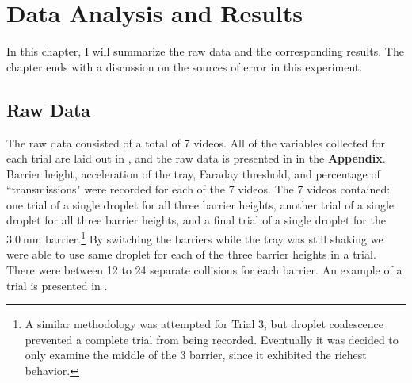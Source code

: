 \chapter{Data Analysis and Results}

In this chapter, I will summarize the raw data and the corresponding results. The chapter ends with a discussion on the sources of error in this experiment.

\section{Raw Data}



The raw data consisted of a total of 7 videos. All of the variables collected for each trial are laid out in , and the raw data is presented in  in the \textbf{Appendix}. Barrier height, acceleration of the tray, Faraday threshold, and percentage of ``transmissions" were recorded for each of the 7 videos. The 7 videos contained: one trial of a single droplet for all three barrier heights, another trial of a single droplet for all three barrier heights, and a final trial of a single droplet for the $3.0~\mathrm{mm}$ barrier.\footnote{A similar methodology was attempted for Trial 3, but droplet coalescence prevented a complete trial from being recorded. Eventually it was decided to only examine the middle of the 3 barrier, since it exhibited the richest behavior.} By switching the barriers while the tray was still shaking we were able to use same droplet for each of the three barrier heights in a trial. There were between 12 to 24 separate collisions for each barrier. An example of a trial is presented in .

